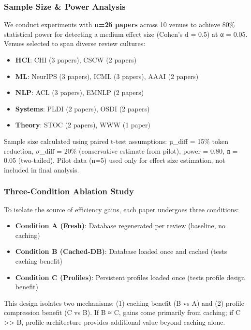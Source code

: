 \subsubsection{Sample Size \& Power Analysis}

We conduct experiments with \textbf{n=25 papers} across 10 venues to achieve 80\% statistical power for detecting a medium effect size (Cohen's d = 0.5) at α = 0.05. Venues selected to span diverse review cultures:

\begin{itemize}
\item \textbf{HCI}: CHI (3 papers), CSCW (2 papers)
\item \textbf{ML}: NeurIPS (3 papers), ICML (3 papers), AAAI (2 papers)
\item \textbf{NLP}: ACL (3 papers), EMNLP (2 papers)
\item \textbf{Systems}: PLDI (2 papers), OSDI (2 papers)
\item \textbf{Theory}: STOC (2 papers), WWW (1 paper)
\end{itemize}

Sample size calculated using paired t-test assumptions: µ\_diff = 15\% token reduction, $\sigma$\_diff = 20\% (conservative estimate from pilot), power = 0.80, α = 0.05 (two-tailed). Pilot data (n=5) used only for effect size estimation, not included in final analysis.

\subsubsection{Three-Condition Ablation Study}

To isolate the source of efficiency gains, each paper undergoes three conditions:

\begin{itemize}
\item \textbf{Condition A (Fresh)}: Database regenerated per review (baseline, no caching)
\item \textbf{Condition B (Cached-DB)}: Database loaded once and cached (tests caching benefit)
\item \textbf{Condition C (Profiles)}: Persistent profiles loaded once (tests profile design benefit)
\end{itemize}

This design isolates two mechanisms: (1) caching benefit (B vs A) and (2) profile compression benefit (C vs B). If B ≈ C, gains come primarily from caching; if C >> B, profile architecture provides additional value beyond caching alone.

